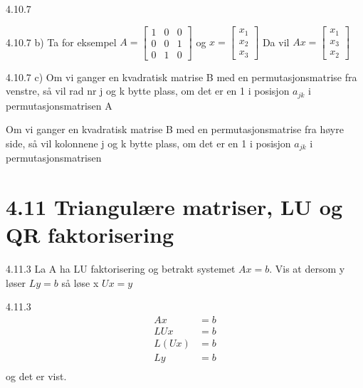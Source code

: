 \documentclass[a4paper,norsk]{article}
\begin{document}
\begin{oppgavebox}{4.10.7}{}
\begin{proofbox}{4.10.7 b)}{}
Ta for eksempel $ A = \begin{bmatrix}
    1&0&0\\
    0&0&1\\
    0&1&0
\end{bmatrix}  $ og $ x = \begin{bmatrix}
    x_1\\
    x_2\\
    x_3
\end{bmatrix}  $ 
Da vil $ Ax = \begin{bmatrix}
    x_1\\
    x_3\\
    x_2
\end{bmatrix}  $ 
    
\end{proofbox}

\begin{proofbox}{4.10.7 c)}{}
Om vi ganger en kvadratisk matrise B med en permutasjonsmatrise fra venstre, så vil rad nr j og k bytte plass, om det er en 1 i posisjon $ a_{jk} $  i permutasjonsmatrisen A

Om vi ganger en kvadratisk matrise B med en permutasjonsmatrise fra høyre side, så vil kolonnene j og k bytte plass, om det er en 1 i posisjon $ a_{jk} $ i permutasjonsmatrisen  
\end{proofbox}

\end{oppgavebox}

\section*{4.11 Triangulære matriser, LU og QR faktorisering}

\begin{oppgavebox}{4.11.3}{}
La A ha LU faktorisering og betrakt systemet $ Ax=b $. Vis at dersom y løser $ Ly=b $ så løse x $ Ux = y $

\begin{proofbox}{4.11.3}{}
    \begin{align*}
        Ax &= b \\
        LUx &= b\\
        L \left( Ux \right) &= b\\
        Ly &= b \\
    \end{align*}
    og det er vist.
\end{proofbox}
\end{oppgavebox}
\end{document}
